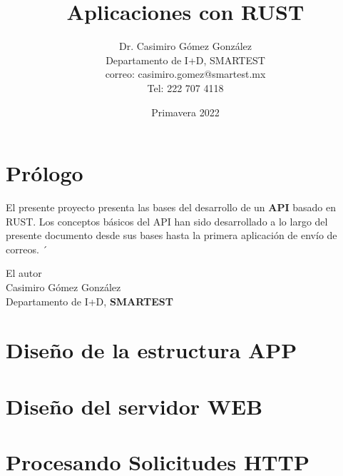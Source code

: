 \documentclass[12pt]{book}
\title{Aplicaciones con RUST}
\author{Dr. Casimiro Gómez González\\
	Departamento de I+D, SMARTEST\\
               correo: casimiro.gomez@smartest.mx\\
               Tel: 222 707 4118}
\date{Primavera 2022}
\theoremstyle{definition}
\theoremstyle{remark}
\theoremstyle{plain}
\begin{document}
\frontmatter
\maketitle


\chapter{Prólogo}

El presente proyecto presenta las bases del desarrollo de un \textbf{API} basado en RUST. Los conceptos básicos del API han sido desarrollado a lo largo del presente documento desde sus bases hasta la primera aplicación de envío de correos. 
´
\begin{flushright}

El autor\\
Casimiro Gómez González\\
Departamento de I+D, \textbf{SMARTEST}
\end{flushright}

\tableofcontents

\mainmatter


\chapter{Diseño de la estructura APP}


\chapter{Diseño del servidor WEB}


\chapter{Procesando Solicitudes HTTP}


\backmatter
\end{document}
